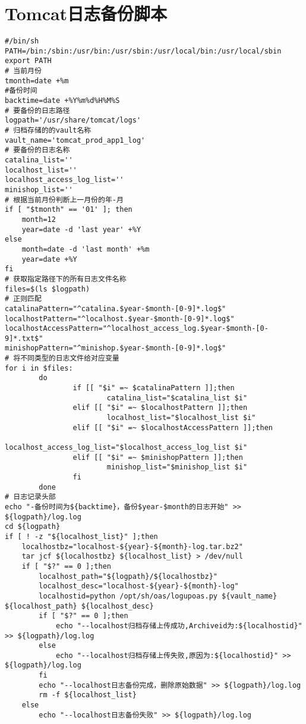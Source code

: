 \chapter{Tomcat日志备份脚本}
\label{cha:Tomcatlog}
\begin{lstlisting}[numbers=none]
#/bin/sh
PATH=/bin:/sbin:/usr/bin:/usr/sbin:/usr/local/bin:/usr/local/sbin
export PATH
# 当前月份
tmonth=date +%m
#备份时间
backtime=date +%Y%m%d%H%M%S
# 要备份的日志路径
logpath='/usr/share/tomcat/logs'
# 归档存储的的vault名称
vault_name='tomcat_prod_app1_log'
# 要备份的日志名称
catalina_list=''
localhost_list=''
localhost_access_log_list=''
minishop_list=''
# 根据当前月份判断上一月份的年-月
if [ "$tmonth" == '01' ]; then
    month=12
    year=date -d 'last year' +%Y
else
    month=date -d 'last month' +%m
    year=date +%Y
fi
# 获取指定路径下的所有日志文件名称
files=$(ls $logpath)
# 正则匹配
catalinaPattern="^catalina.$year-$month-[0-9]*.log$"
localhostPattern="^localhost.$year-$month-[0-9]*.log$"
localhostAccessPattern="^localhost_access_log.$year-$month-[0-9]*.txt$"
minishopPattern="^minishop.$year-$month-[0-9]*.log$"
# 将不同类型的日志文件给对应变量
for i in $files:
        do
                if [[ "$i" =~ $catalinaPattern ]];then
                        catalina_list="$catalina_list $i"
                elif [[ "$i" =~ $localhostPattern ]];then
                        localhost_list="$localhost_list $i"
                elif [[ "$i" =~ $localhostAccessPattern ]];then
                        localhost_access_log_list="$localhost_access_log_list $i"
                elif [[ "$i" =~ $minishopPattern ]];then
                        minishop_list="$minishop_list $i"
                fi
        done
# 日志记录头部
echo "-备份时间为${backtime}，备份$year-$month的日志开始" >> ${logpath}/log.log
cd ${logpath}
if [ ! -z "${localhost_list}" ];then
    localhostbz="localhost-${year}-${month}-log.tar.bz2"
    tar jcf ${localhostbz} ${localhost_list} > /dev/null
    if [ "$?" == 0 ];then
        localhost_path="${logpath}/${localhostbz}"
        localhost_desc="localhost-${year}-${month}-log"
        localhostid=python /opt/sh/oas/logupoas.py ${vault_name} ${localhost_path} ${localhost_desc}
        if [ "$?" == 0 ];then
            echo "--localhost归档存储上传成功,Archiveid为:${localhostid}" >> ${logpath}/log.log
        else
            echo "--localhost归档存储上传失败,原因为:${localhostid}" >> ${logpath}/log.log
        fi
        echo "--localhost日志备份完成，删除原始数据" >> ${logpath}/log.log
        rm -f ${localhost_list}
    else
        echo "--localhost日志备份失败" >> ${logpath}/log.log

\end{lstlisting}
